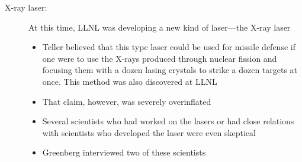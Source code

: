 \documentclass[12pt]{article}
\begin{document}
\begin{description}
\begin{description}
        

      \item[X-ray laser:] At this time, LLNL was developing a new kind of
        laser---the X-ray laser
        \begin{itemize}

          \item Teller believed that this type laser could be used for missile
            defense if one were to use the X-rays produced through nuclear
            fission and focusing them with a dozen lasing crystals to strike a
            dozen targets at once. This method was also discovered at LLNL

          \item That claim, however, was severely overinflated

          \item Several scientists who had worked on the lasers or had close
            relations with scientists who developed the laser were even
            skeptical

          \item Greenberg interviewed two of these scientists


\end{itemize}
\end{description}
\end{description}
\end{document}
